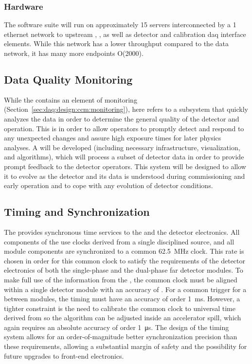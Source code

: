 \subsubsection{Hardware}
\label{sec:daq:design:ccm:hardware}

The  software suite will run on approximately 15 servers interconnected by a \SI{1}{\Gbps} ethernet network to upstream , ,  as well as detector and calibration daq interface elements. While this network has a lower throughput compared to the data network, it has many more endpoints O(2000).

\subsection{Data Quality Monitoring}
\label{sec:daq:design-data-quality}

While the  contains an element of monitoring (Section~\ref{sec:daq:design:ccm:monitoring}), here  refers to a subsystem that quickly analyzes the data in order to determine the general quality of the detector and  operation.
This is in order to allow operators to promptly detect and respond to any unexpected changes and assure high exposure times for later physics analyses. 
A   
will be developed (including necessary infrastructure, visualization,
and algorithms), which will process a subset of detector data in order
to provide prompt feedback to the detector operators. 
This system will be designed to allow it to evolve as the detector and its data is understood during commissioning and early operation and to cope with any evolution of detector conditions.


\subsection{Timing and Synchronization}
\label{sec:daq:design-timing}

The  provides synchronous time services to the  and the detector electronics.
All components of the  use clocks derived from a single
 disciplined source, and all module components are
synchronized to a common \SI{62.5}{MHz} clock.
%
This rate is chosen in order for this common clock to satisfy the requirements of the detector electronics of both the single-phase and the dual-phase far detector modules.
%
To make full use of the information from the , the common clock must be aligned within a single detector 
module with an accuracy of . 
For a common trigger for a  between modules, the timing must have an accuracy of order \SI{1}{\milli\second}.
However, a tighter constraint is the need to calibrate the common clock to universal time derived from  so the  algorithm can be adjusted inside an accelerator spill, which again requires an absolute accuracy of order \SI{1}{\micro\second}. The design of the timing system allows for an order-of-magnitude better synchronization precision than these requirements, allowing a substantial margin of safety and the possibility for future upgrades to front-end electronics.


